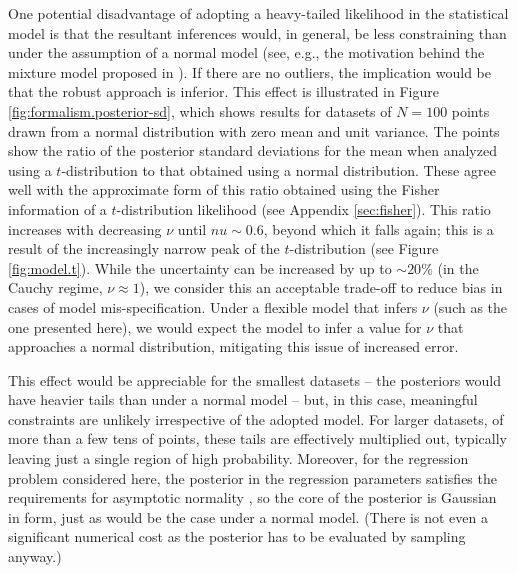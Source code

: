 \documentclass[fleqn,usenatbib]{rasti}
\begin{document}
One potential disadvantage of adopting a heavy-tailed likelihood in the
statistical model is that the resultant inferences would, in general, be less
constraining than under the assumption of a normal model (see, e.g., the
motivation behind the mixture model proposed in \citealt{Tak:2019}).  If there
are no outliers, the implication would be that the robust approach is inferior.
This effect is illustrated in Figure \ref{fig:formalism.posterior-sd}, which
shows results for datasets of $N=100$ points drawn from a normal distribution
with zero mean and unit variance. The points show the ratio of the posterior
standard deviations for the mean when analyzed using a $t$-distribution to that
obtained using a normal distribution. These agree well with the approximate form
of this ratio obtained using the Fisher information of a $t$-distribution
likelihood (see Appendix \ref{sec:fisher}). This ratio increases with decreasing
$\nu$ until $nu \sim 0.6$, beyond which it falls again; this is a result of the
increasingly narrow peak of the $t$-distribution (see Figure \ref{fig:model.t}).
While the uncertainty can be increased by up to $\sim20\%$ (in the Cauchy
regime, $\nu \approx 1$), we consider this an acceptable trade-off to reduce
bias in cases of model mis-specification. Under a flexible model that infers
$\nu$ (such as the one presented here), we would expect the model to infer a
value for $\nu$ that approaches a normal distribution, mitigating this issue of
increased error.

This effect would be appreciable for the smallest datasets -- the posteriors
would have heavier tails than under a normal model -- but, in this case,
meaningful constraints are unlikely irrespective of the adopted model. For
larger datasets, of more than a few tens of points, these tails are effectively
multiplied out, typically leaving just a single region of high probability.
Moreover, for the regression problem considered here, the posterior in the
regression parameters satisfies the requirements for asymptotic normality
\citep[e.g.][]{Ghosh_etal:2006}, so the core of the posterior is Gaussian in
form, just as would be the case under a normal model.  (There is not even a
significant numerical cost as the posterior has to be evaluated by sampling
anyway.)
\end{document}
